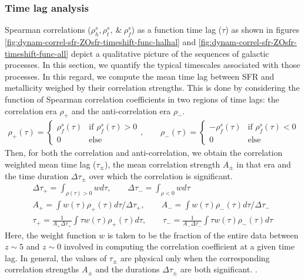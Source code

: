 \subsubsection{Time lag analysis}
\label{sec:time-lag-analysis}
Spearman correlations ($\rho^s_h, \rho^s_t, ~\&~ \rho^s_f$) as a function time lag ($\tau$) as shown in figures \ref{fig:dynam-correl-sfr-ZOsfr-timeshift-func-halhal} and \ref{fig:dynam-correl-sfr-ZOsfr-timeshift-func-all} depict a qualitative picture of the sequences of galactic processes. In this section, we quantify the typical timescales associated with those processes. In this regard, we compute the mean time lag between SFR and metallicity weighed by their correlation strengths. This is done by considering the function of Spearman correlation coefficients in two regions of time lags: the correlation era $\rho_{+}$ and the anti-correlation era $\rho_{-}$.
\begin{gather}
\rho_{+}(\tau) = 
\begin{cases} 
\rho^s_f(\tau) & \text{if } \rho^s_f(\tau) > 0 \\ 
0 & \text{else} 
\end{cases}, \qquad
\rho_{-}(\tau) = 
\begin{cases} 
-\rho^s_f(\tau) & \text{if } \rho^s_f(\tau) < 0 \\
0 & \text{else} 
\end{cases}
\end{gather}
Then, for both the correlation and anti-correlation, we obtain the correlation weighted mean time lag ($\tau_{\pm}$), the mean correlation strength $A_{\pm}$ in that era and the time duration $\Delta\tau_{\pm}$
over which the correlation is significant.
\begin{gather}
\Delta\tau_{+} = \int_{\rho(\tau)>0} w d\tau , \qquad \Delta\tau_{-} = \int_{\rho<0} w d\tau   \\
A_{+} = \int w(\tau) \rho_{+}(\tau) d\tau / \Delta\tau_{+}, \qquad A_{-} = \int w(\tau) \rho_{-}(\tau) d\tau / \Delta\tau_{-} \\
\tau_{+} = \frac{1}{A_{+} \Delta\tau_{+}} \int \tau w(\tau) \rho_{+}(\tau) d\tau , \qquad \tau_{-} = \frac{1}{A_{-}\Delta\tau_{-}} \int \tau w(\tau) \rho_{-}(\tau) d\tau     
\end{gather}
Here, the weight function $w$ is taken to be the fraction of the entire data between $z \sim 5$ and $z \sim 0$ involved in computing the correlation coefficient at a given time lag. In general, the values of $\tau_{\pm}$ are physical only when the corresponding correlation strengths $A_{\pm}$ and the durations $\Delta \tau_{\pm}$ are both significant. .

